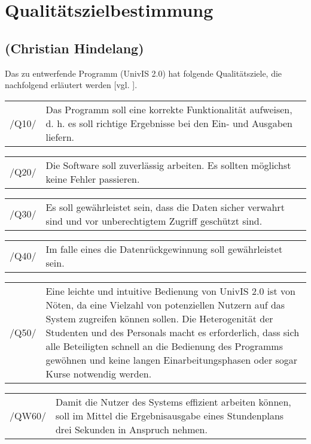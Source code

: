\section{Qualitätszielbestimmung}
\label{sec:Qualitätszielbestimmung}

\subsection*{(Christian Hindelang)}

Das zu entwerfende Programm (UnivIS 2.0) hat folgende Qualitätsziele, die nachfolgend erläutert werden [vgl. \cite{UniRos12a}]. 

\begin{tabular}{p{1.5cm}p{14.5cm}}
 /Q10/	& Das Programm soll eine korrekte Funktionalität aufweisen, d. h. es soll richtige Ergebnisse bei den Ein- und Ausgaben liefern. \\[0.25cm]	 
\end{tabular}

\begin{tabular}{p{1.5cm}p{14.5cm}}
 /Q20/	& Die Software soll zuverlässig arbeiten. Es sollten möglichst keine Fehler passieren. \\[0.25cm]	 
 \end{tabular}

\begin{tabular}{p{1.5cm}p{14.5cm}}
 /Q30/	& Es soll gewährleistet sein, dass die Daten sicher verwahrt sind und vor unberechtigtem Zugriff geschützt sind. \\[0.25cm]	 
\end{tabular}

\begin{tabular}{p{1.5cm}p{14.5cm}}
 /Q40/	& Im falle eines die Datenrückgewinnung soll gewährleistet sein. \\[0.25cm]	 
\end{tabular}

\begin{tabular}{p{1.5cm}p{14.5cm}}
 /Q50/	& Eine leichte und intuitive Bedienung von UnivIS 2.0 ist von Nöten, da eine Vielzahl von potenziellen Nutzern auf das System zugreifen können sollen. Die Heterogenität der Studenten und des Personals macht es erforderlich, dass sich alle Beteiligten schnell an die Bedienung des Programms gewöhnen und keine langen Einarbeitungsphasen oder sogar Kurse notwendig werden. \\[0.25cm]	 
\end{tabular}

\begin{tabular}{p{1.5cm}p{14.5cm}}
 /QW60/	& Damit die Nutzer des Systems effizient arbeiten können, soll im Mittel die Ergebnisausgabe eines Stundenplans drei Sekunden in Anspruch nehmen. \\[0.25cm]	 
\end{tabular}


